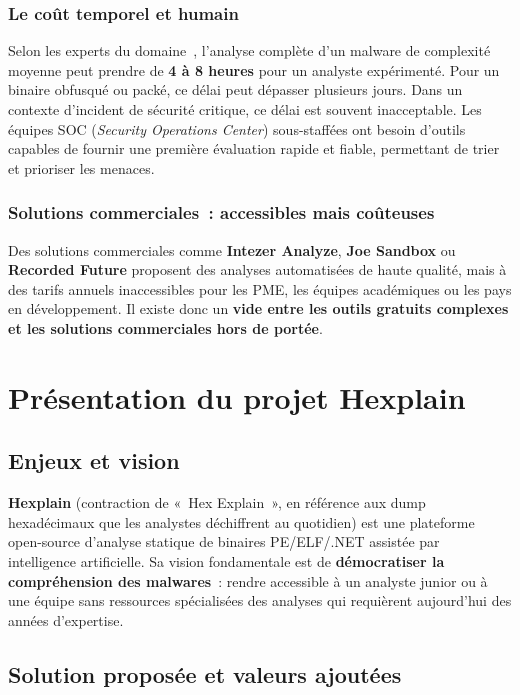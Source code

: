 \subsubsection{Le coût temporel et humain}

Selon les experts du domaine~\cite{sikorski2012practical}, l'analyse complète d'un malware de complexité moyenne peut prendre de \textbf{4 à 8 heures} pour un analyste expérimenté. Pour un binaire obfusqué ou packé, ce délai peut dépasser plusieurs jours. Dans un contexte d'incident de sécurité critique, ce délai est souvent inacceptable. Les équipes SOC (\textit{Security Operations Center}) sous-staffées ont besoin d'outils capables de fournir une première évaluation rapide et fiable, permettant de trier et prioriser les menaces.

\subsubsection{Solutions commerciales~: accessibles mais coûteuses}

Des solutions commerciales comme \textbf{Intezer Analyze}, \textbf{Joe Sandbox} ou \textbf{Recorded Future} proposent des analyses automatisées de haute qualité, mais à des tarifs annuels inaccessibles pour les PME, les équipes académiques ou les pays en développement. Il existe donc un \textbf{vide entre les outils gratuits complexes et les solutions commerciales hors de portée}.

\section{Présentation du projet Hexplain}

\subsection{Enjeux et vision}

\textbf{Hexplain} (contraction de «~Hex Explain~», en référence aux dump hexadécimaux que les analystes déchiffrent au quotidien) est une plateforme open-source d'analyse statique de binaires PE/ELF/.NET assistée par intelligence artificielle. Sa vision fondamentale est de \textbf{démocratiser la compréhension des malwares}~: rendre accessible à un analyste junior ou à une équipe sans ressources spécialisées des analyses qui requièrent aujourd'hui des années d'expertise.

\subsection{Solution proposée et valeurs ajoutées}

